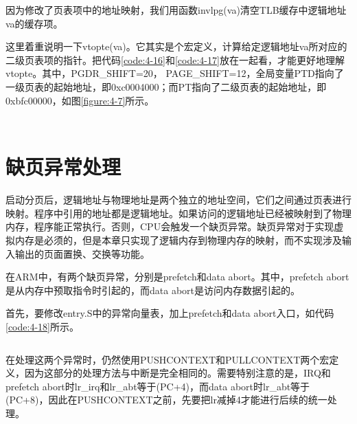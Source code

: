 \documentclass[main.tex]{subfiles}
\begin{document}
\begin{CJK*}{UTF8}{song}
\noindent
因为修改了页表项中的地址映射，我们用函数invlpg(va)清空TLB缓存中逻辑地址va的缓存项。

\par
这里着重说明一下vtopte(va)。它其实是个宏定义，计算给定逻辑地址va所对应的二级页表项的指针。把代码\ref{code:4-16}和\ref{code:4-17}放在一起看，才能更好地理解vtopte。其中，PGDR\_SHIFT=20， PAGE\_SHIFT=12，全局变量PTD指向了一级页表的起始地址，即0xc0004000；而PT指向了二级页表的起始地址，即0xbfc00000，如图\ref{figure:4-7}所示。

\begin{code}
\label{code:4-16}
\inputminted[firstline=40,lastline=50,linenos,numbersep=5pt,frame=lines,framesep=2mm]{c}{src/chapter04/kernel/kernel.h}
\end{code}

\begin{code}
\label{code:4-17}
\inputminted[firstline=25,lastline=26,linenos,numbersep=5pt,frame=lines,framesep=2mm]{c}{src/chapter04/kernel/kernel.c}
\end{code}

\section{缺页异常处理}\label{section:page-fault}
启动分页后，逻辑地址与物理地址是两个独立的地址空间，它们之间通过页表进行映射。程序中引用的地址都是逻辑地址。如果访问的逻辑地址已经被映射到了物理内存，程序能正常执行。否则，CPU会触发一个缺页异常。缺页异常对于实现虚拟内存是必须的，但是本章只实现了逻辑内存到物理内存的映射，而不实现涉及输入输出的页面置换、交换等功能。

\par
在ARM中，有两个缺页异常，分别是prefetch和data abort。其中，prefetch abort是从内存中预取指令时引起的，而data abort是访问内存数据引起的。

\par
首先，要修改entry.S中的异常向量表，加上prefetch和data abort入口，如代码\ref{code:4-18}所示。

\begin{code}
\label{code:4-18}
\inputminted[firstline=91,lastline=106,linenos,numbersep=5pt,frame=lines,framesep=2mm]{gas}{src/chapter04/kernel/entry.S}
\end{code}

在处理这两个异常时，仍然使用PUSHCONTEXT和PULLCONTEXT两个宏定义，因为这部分的处理方法与中断是完全相同的。需要特别注意的是，IRQ和prefetch abort时lr\_irq和lr\_abt等于(PC+4)，而data abort时lr\_abt等于(PC+8)，因此在PUSHCONTEXT之前，先要把lr减掉4才能进行后续的统一处理。


\end{CJK*}
\end{document}
